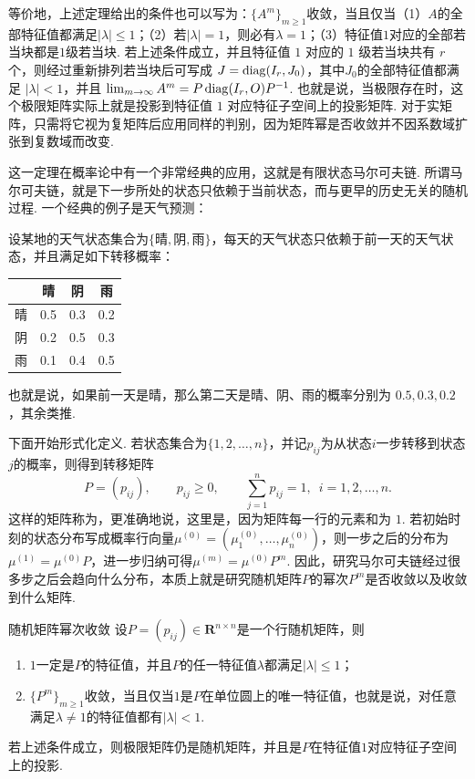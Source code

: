 等价地，上述定理给出的条件也可以写为：$\{A^m\}_{m\geqslant 1}$收敛，当且仅当（1）$A$的全部特征值都满足$|\lambda|\leqslant 1$；（2）若$|\lambda|=1$，则必有$\lambda=1$；（3）特征值$1$对应的全部若当块都是$1$级若当块. 若上述条件成立，并且特征值 $1$ 对应的 $1$ 级若当块共有 $r$ 个，则经过重新排列若当块后可写成 $J=\operatorname{diag}(I_r,J_0)$，其中$J_0$的全部特征值都满足 $|\lambda| < 1$，并且 $\lim_{m\to\infty}A^m=P\operatorname{diag}(I_r,O)P^{-1}$. 也就是说，当极限存在时，这个极限矩阵实际上就是投影到特征值 $1$ 对应特征子空间上的投影矩阵. 对于实矩阵，只需将它视为复矩阵后应用同样的判别，因为矩阵幂是否收敛并不因系数域扩张到复数域而改变.

这一定理在概率论中有一个非常经典的应用，这就是有限状态马尔可夫链. 所谓马尔可夫链，就是下一步所处的状态只依赖于当前状态，而与更早的历史无关的随机过程. 一个经典的例子是天气预测：

\begin{example}{}{}
    设某地的天气状态集合为$\{\text{晴},\text{阴},\text{雨}\}$，每天的天气状态只依赖于前一天的天气状态，并且满足如下转移概率：
    \begin{center}
        \begin{tabular}{c|ccc}
            & 晴   & 阴   & 雨   \\ \hline
            晴 & 0.5  & 0.3  & 0.2  \\
            阴 & 0.2  & 0.5  & 0.3  \\
            雨 & 0.1  & 0.4  & 0.5
        \end{tabular}
    \end{center}
    也就是说，如果前一天是晴，那么第二天是晴、阴、雨的概率分别为 $0.5, 0.3, 0.2$，其余类推.
\end{example}

下面开始形式化定义. 若状态集合为$\{1,2,\ldots,n\}$，并记$p_{ij}$为从状态$i$一步转移到状态$j$的概率，则得到转移矩阵
\[P=(p_{ij}),\qquad p_{ij}\geqslant 0,\qquad \sum_{j=1}^np_{ij}=1,\enspace i=1,2,\ldots,n.\]
这样的矩阵称为，更准确地说，这里是，因为矩阵每一行的元素和为 $1$. 若初始时刻的状态分布写成概率行向量$\mu^{(0)}=(\mu_1^{(0)},\ldots,\mu_n^{(0)})$，则一步之后的分布为$\mu^{(1)}=\mu^{(0)}P$，进一步归纳可得$\mu^{(m)}=\mu^{(0)}P^m$. 因此，研究马尔可夫链经过很多步之后会趋向什么分布，本质上就是研究随机矩阵$P$的幂次$P^m$是否收敛以及收敛到什么矩阵.

\begin{corollary}{}{随机矩阵幂次收敛}
    设$P=(p_{ij})\in\mathbf{R}^{n\times n}$是一个行随机矩阵，则
    \begin{enumerate}
        \item $1$一定是$P$的特征值，并且$P$的任一特征值$\lambda$都满足$|\lambda|\leqslant 1$；
        \item $\{P^m\}_{m\geqslant 1}$收敛，当且仅当$1$是$P$在单位圆上的唯一特征值，也就是说，对任意满足$\lambda\neq 1$的特征值都有$|\lambda|<1$.
    \end{enumerate}
    若上述条件成立，则极限矩阵仍是随机矩阵，并且是$P$在特征值$1$对应特征子空间上的投影.
\end{corollary}

